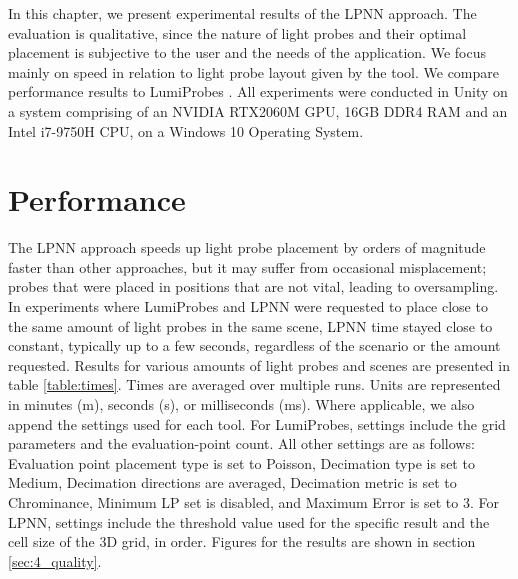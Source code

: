 In this chapter, we present experimental results of the LPNN approach. The evaluation is qualitative, since the nature of light probes and their optimal placement is subjective to the user and the needs of the application. We focus mainly on speed in relation to light probe layout given by the tool. We compare performance results to LumiProbes \parencite{Vardis2021}. All experiments were conducted in Unity on a system comprising of an NVIDIA RTX2060M GPU, 16GB DDR4 RAM and an Intel i7-9750H CPU, on a Windows 10 Operating System.

\section{Performance}
\label{sec:4_performance}
The LPNN approach speeds up light probe placement by orders of magnitude faster than other approaches, but it may suffer from occasional misplacement; probes that were placed in positions that are not vital, leading to oversampling. In experiments where LumiProbes and LPNN were requested to place close to the same amount of light probes in the same scene, LPNN time stayed close to constant, typically up to a few seconds, regardless of the scenario or the amount requested. Results for various amounts of light probes and scenes are presented in table \ref{table:times}. Times are averaged over multiple runs. Units are represented in minutes (m), seconds (s), or milliseconds (ms). Where applicable, we also append the settings used for each tool. For LumiProbes, settings include the grid parameters and the evaluation-point count. All other settings are as follows: Evaluation point placement type is set to Poisson, Decimation type is set to Medium, Decimation directions are averaged, Decimation metric is set to  Chrominance, Minimum LP set is disabled, and Maximum Error is set to 3. For LPNN, settings include the threshold value used for the specific result and the cell size of the 3D grid, in order. Figures for the results are shown in section \ref{sec:4_quality}.

